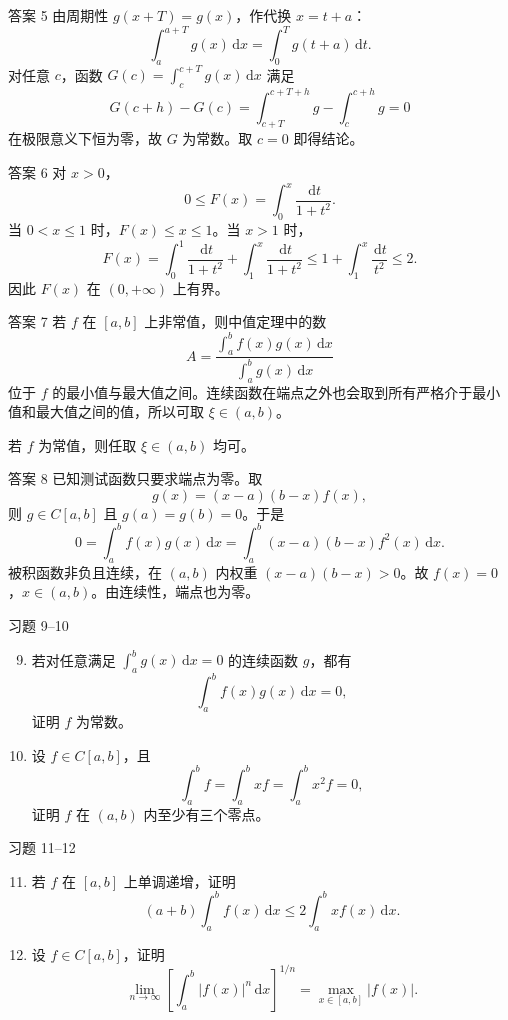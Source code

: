 ﻿\documentclass[aspectratio=169,11pt]{ctexbeamer}
\newcommand{\dd}{\,\mathrm{d}}
\newcommand{\abs}[1]{\left|#1\right|}
\begin{document}
\begin{frame}{答案 5}
  由周期性 $g(x+T)=g(x)$，作代换 $x=t+a$：
  \[
    \int_a^{a+T}g(x)\dd x=\int_0^T g(t+a)\dd t.
  \]
  对任意 $c$，函数 $G(c)=\int_c^{c+T}g(x)\dd x$ 满足
  \[
    G(c+h)-G(c)=\int_{c+T}^{c+T+h}g-\int_c^{c+h}g=0
  \]
  在极限意义下恒为零，故 $G$ 为常数。取 $c=0$ 即得结论。
\end{frame}

\begin{frame}{答案 6}
  对 $x>0$，
  \[
    0\le F(x)=\int_0^x\frac{\dd t}{1+t^2}.
  \]
  当 $0<x\le1$ 时，$F(x)\le x\le1$。当 $x>1$ 时，
  \[
    F(x)=\int_0^1\frac{\dd t}{1+t^2}
      +\int_1^x\frac{\dd t}{1+t^2}
    \le 1+\int_1^x\frac{\dd t}{t^2}
    \le 2.
  \]
  因此 $F(x)$ 在 $(0,+\infty)$ 上有界。
\end{frame}

\begin{frame}{答案 7}
  若 $f$ 在 $[a,b]$ 上非常值，则中值定理中的数
  \[
    A=\frac{\int_a^b f(x)g(x)\dd x}{\int_a^b g(x)\dd x}
  \]
  位于 $f$ 的最小值与最大值之间。连续函数在端点之外也会取到所有严格介于最小值和最大值之间的值，所以可取 $\xi\in(a,b)$。

  若 $f$ 为常值，则任取 $\xi\in(a,b)$ 均可。
\end{frame}

\begin{frame}{答案 8}
  已知测试函数只要求端点为零。取
  \[
    g(x)=(x-a)(b-x)f(x),
  \]
  则 $g\in C[a,b]$ 且 $g(a)=g(b)=0$。于是
  \[
    0=\int_a^b f(x)g(x)\dd x
    =\int_a^b (x-a)(b-x)f^2(x)\dd x.
  \]
  被积函数非负且连续，在 $(a,b)$ 内权重 $(x-a)(b-x)>0$。故 $f(x)=0$，$x\in(a,b)$。由连续性，端点也为零。
\end{frame}

\begin{frame}{习题 9--10}
  \begin{enumerate}
    \setcounter{enumi}{8}
    \item 若对任意满足 $\int_a^b g(x)\dd x=0$ 的连续函数 $g$，都有
    \[
      \int_a^b f(x)g(x)\dd x=0,
    \]
    证明 $f$ 为常数。
    \item 设 $f\in C[a,b]$，且
    \[
      \int_a^b f=\int_a^b xf=\int_a^b x^2f=0,
    \]
    证明 $f$ 在 $(a,b)$ 内至少有三个零点。
  \end{enumerate}
\end{frame}

\begin{frame}{习题 11--12}
  \begin{enumerate}
    \setcounter{enumi}{10}
    \item 若 $f$ 在 $[a,b]$ 上单调递增，证明
    \[
      (a+b)\int_a^b f(x)\dd x\le2\int_a^b x f(x)\dd x.
    \]
    \item 设 $f\in C[a,b]$，证明
    \[
      \lim_{n\to\infty}\left[\int_a^b\abs{f(x)}^n\dd x\right]^{1/n}
      =\max_{x\in[a,b]}\abs{f(x)}.
    \]
  \end{enumerate}
\end{frame}
\end{document}
